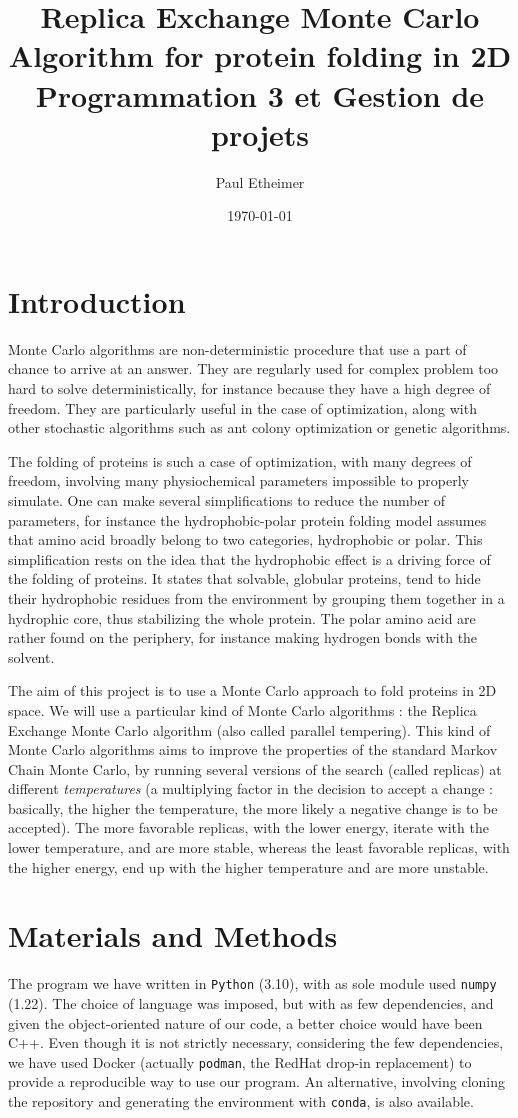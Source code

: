 \documentclass[a4paper, 12pt]{article}
\author{Paul Etheimer}
\date{\today}
\title{Replica Exchange Monte Carlo Algorithm for protein folding in 2D\\\medskip
\large Programmation 3 et Gestion de projets}
\begin{document}
\maketitle
\section*{Introduction}
\label{sec:orgf9cb60f}
Monte Carlo algorithms are non-deterministic procedure that use a part of chance to arrive at an answer. They are regularly used for complex problem too hard to solve deterministically, for instance because they have a high degree of freedom. They are particularly useful in the case of optimization, along with other stochastic algorithms such as ant colony optimization or genetic algorithms.


The folding of proteins is such a case of optimization, with many degrees of freedom, involving many physiochemical parameters impossible to properly simulate. One can make several simplifications to reduce the number of parameters, for instance the hydrophobic-polar protein folding model assumes that amino acid broadly belong to two categories, hydrophobic or polar. This simplification rests on the idea that the hydrophobic effect is a driving force of the folding of proteins. It states that solvable, globular proteins, tend to hide their hydrophobic residues from the environment by grouping them together in a hydrophic core, thus stabilizing the whole protein. The polar amino acid are rather found on the periphery, for instance making hydrogen bonds with the solvent.

The aim of this project is to use a Monte Carlo approach to fold proteins in 2D space. We will use a particular kind of Monte Carlo algorithms : the Replica Exchange Monte Carlo algorithm (also called parallel tempering). This kind of Monte Carlo algorithms aims to improve the properties of the standard Markov Chain Monte Carlo, by running several versions of the search (called replicas) at different \emph{temperatures} (a multiplying factor in the decision to accept a change : basically, the higher the temperature, the more likely a negative change is to be accepted). The more favorable replicas, with the lower energy, iterate with the lower temperature, and are more stable, whereas the least favorable replicas, with the higher energy, end up with the higher temperature and are more unstable.
\section*{Materials and Methods}
\label{sec:org8a9f2df}
The program we have written in \texttt{Python} (3.10), with as sole module used \texttt{numpy} (1.22). The choice of language was imposed, but with as few dependencies, and given the object-oriented nature of our code, a better choice would have been C++. Even though it is not strictly necessary, considering the few dependencies, we have used Docker (actually \texttt{podman}, the RedHat drop-in replacement) to provide a reproducible way to use our program. An alternative, involving cloning the repository and generating the environment with \texttt{conda}, is also available.
\end{document}
